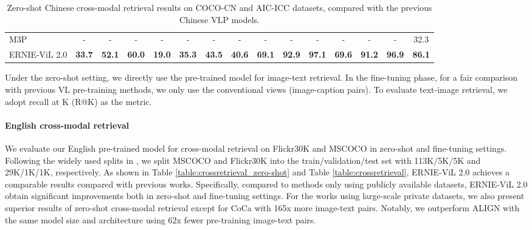 \documentclass{article}
\begin{document}
\begin{table*}[]
{\begin{tabular}{@{}lcccccccccccccc@{}}
\multicolumn{1}{l|}{M3P} & - & - & \multicolumn{1}{c|}{-} & - & - & \multicolumn{1}{c|}{-} & \multicolumn{1}{c|}{-} & - & - & \multicolumn{1}{c|}{-} & - & - & \multicolumn{1}{c|}{-} & 32.3 \\
\multicolumn{1}{l|}{ERNIE-ViL 2.0} & \textbf{33.7} & \textbf{52.1} & \multicolumn{1}{c|}{\textbf{60.0}} & \textbf{19.0} & \textbf{35.3} & \multicolumn{1}{c|}{\textbf{43.5}} & \multicolumn{1}{c|}{\textbf{40.6}} & \textbf{69.1} & \textbf{92.9} & \multicolumn{1}{c|}{\textbf{97.1}} & \textbf{69.6} & \textbf{91.2} & \multicolumn{1}{c|}{\textbf{96.9}} & \textbf{86.1} \\ \bottomrule
\end{tabular}
}
\caption{ Zero-shot Chinese cross-modal retrieval results on COCO-CN and AIC-ICC datasets, compared with the previous Chinese VLP models.}
\label{table_ch_1}
\end{table*}
Under the zero-shot setting, we directly use the pre-trained model for image-text retrieval. In the fine-tuning phase, for a fair comparison with previous VL pre-training methods, we only use the conventional views (image-caption pairs). To evaluate text-image retrieval, we adopt recall at K (R@K) as the metric. 
\paragraph{English cross-modal retrieval}
We evaluate our English pre-trained model for cross-modal retrieval on Flickr30K \cite{flickrentitiesijcv} and MSCOCO \cite{Chen2015MicrosoftCC} in zero-shot and fine-tuning settings. Following the widely used splits in \cite{Karpathy2017DeepVA}, we split MSCOCO and Flickr30K into the train/validation/test set with 113K/5K/5K and 29K/1K/1K, respectively. As shown in Table \ref{table:crossretrieval_zero-shot} and Table \ref{table:crossretrieval}, ERNIE-ViL 2.0 achieves a comparable results compared with previous works. Specifically, compared to methods \cite{chen2020uniter,li2020unicoder,singh2021flava,Yu2021ERNIEViLKE,Li2021AlignBF,Li2020OscarOA} only using publicly available datasets, ERNIE-ViL 2.0 obtain significant improvements both in zero-shot and fine-tuning settings. For the works \cite{Radford2021LearningTV,Jia2021ScalingUV,DBLP:journals/corr/abs-2111-07783,yuan2021florence,yu2022coca} using large-scale private datasets, we also present superior results of zero-shot cross-modal retrieval except for CoCa \cite{yu2022coca} with 165x more image-text pairs. Notably, we outperform ALIGN \cite{Jia2021ScalingUV} with the same model size and architecture using 62x fewer pre-training image-text pairs.
\end{document}
